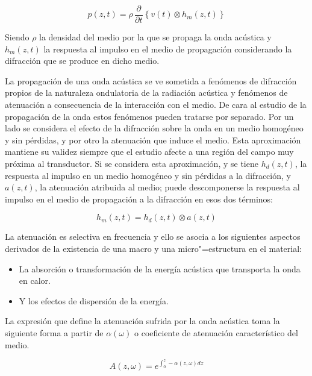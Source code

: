 \begin{equation}
	p(z, t) = \rho\,\frac{\partial}{\partial t}\left\{v(t)\otimes
	h_{m}(z, t)\right\}
	\label{eq:diffracpressure}
\end{equation}

Siendo $\rho$ la densidad del medio por la que se propaga la onda acústica
y $h_{m}(z, t)$ la respuesta al impulso en el medio de propagación
considerando la difracción que se produce en dicho medio.

La propagación de una onda acústica se ve sometida a fenómenos de
difracción propios de la naturaleza ondulatoria de la radiación acústica y
fenómenos de atenuación a consecuencia de la interacción con el medio. De
cara al estudio de la propagación de la onda estos fenómenos pueden
tratarse por separado. Por un lado se considera el efecto de la difracción
sobre la onda en un medio homogéneo y sin pérdidas, y por otro la
atenuación que induce el medio. Esta aproximación mantiene su validez
siempre que el estudio afecte a una región del campo muy próxima al
transductor. Si se considera esta aproximación, y se tiene $h_d(z, t)$, la
respuesta al impulso en un medio homogéneo y sin pérdidas a la difracción,
y $a(z, t)$, la atenuación atribuida al medio; puede descomponerse la
respuesta al impulso en el medio de propagación a la difracción en esos dos
términos:

\begin{equation}
	h_m(z, t) = h_d(z, t)\otimes a(z, t)
	\label{eq:diffraction}
\end{equation}

La atenuación es selectiva en frecuencia y ello se asocia a los siguientes
aspectos derivados de la existencia de una macro y una micro"=estructura en
el material:

\begin{itemize}
	\item La absorción o transformación de la energía acústica que
		transporta la onda en calor.
	\item Y los efectos de dispersión de la energía.
\end{itemize}

La expresión que define la atenuación sufrida por la onda acústica toma la
siguiente forma a partir de $\alpha(\omega)$ o coeficiente de atenuación
característico del medio.

\begin{equation}
	A(z, \omega) = e^{\int^z_0 -\alpha(z, \omega)dz} 
	\label{eq:loss}
\end{equation}

